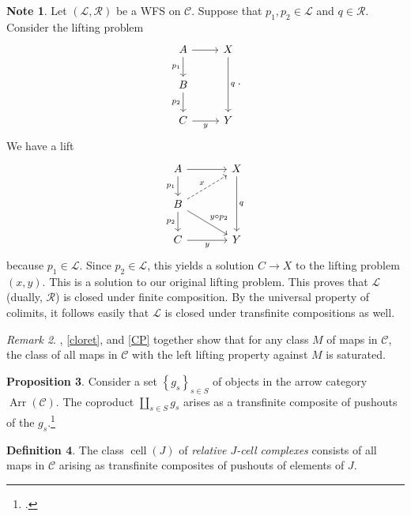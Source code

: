 \documentclass[10pt,letterpaper,cm]{nupset}
\theoremstyle{definition}
\newtheorem{definition}{Definition}[subsection]
\newtheorem{note}[definition]{Note}
\theoremstyle{theorem}
\newtheorem{prop}[definition]{Proposition}
\theoremstyle{remark}
\newtheorem{remark}[definition]{Remark}
\renewcommand{\L}{\mathcal L}
\newcommand{\RI}{\mathcal R}
\newcommand{\0}{\mathbf{0}}
\newcommand{\1}{\mathbf{1}}
\newcommand{\2}{\mathbf{2}}
\DeclareMathOperator{\Ar}{Arr}
\renewcommand{\c}{\mathscr{C}}
\DeclareMathOperator{\cell}{cell}
\begin{document}
\begin{note}\label{transf}
Let $\left(\L, \RI\right)$ be a WFS on $\c$. Suppose that $p_1, p_2 \in \L$ and $q\in \RI$. Consider the lifting problem
\[
\begin{tikzcd}
A \arrow[d, "p_1"'] \arrow[r] & X \arrow[dd, "q"] \\
B \arrow[d, "p_2"']           &                   \\
C \arrow[r, "y"']                   & Y                
\end{tikzcd}
.\] We have a lift
\[
\begin{tikzcd}[column sep=large]
A \arrow[d, "p_1"'] \arrow[r]                          & X \arrow[dd, "q"] \\
B \arrow[d, "p_2"'] \arrow[rd, "y\circ p_2"] \arrow[ru, "x", dashed] &                   \\
C \arrow[r, "y"']                                            & Y                
\end{tikzcd}
\] because $p_1 \in \L$. Since $p_2 \in \L$, this yields a solution $C \to X$ to the lifting problem $\left(x,y\right)$. This is a solution to our original lifting problem. This proves that $\L$ (dually, $\RI$) is closed under finite composition. By the universal property of colimits, it follows easily that $\L$ is closed under transfinite compositions as well.
\end{note}

\begin{remark}\label{Satd}
, \cref{cloret}, and \cref{CP} together show that for any class $M$ of maps in $\c$, the class of all maps in $\c$ with the left lifting property against $M$ is saturated.
\end{remark}

\begin{prop}\label{coppush}
Consider  a set $\left\{g_s\right\}_{s\in S}$ of objects in the arrow category $\Ar(\c)$. The coproduct $\coprod_{s\in S}g_s$ arises as a transfinite composite  of pushouts of the $g_s$.\footnote{\cite[Proposition 10.2.7]{Hirsch}.}
\end{prop}

\begin{definition}
The class $\cell(J)$ of \textit{relative $J$-cell complexes} consists of all maps in $\c$ arising as transfinite composites of pushouts of elements of $J$.
\end{definition}
\end{document}
